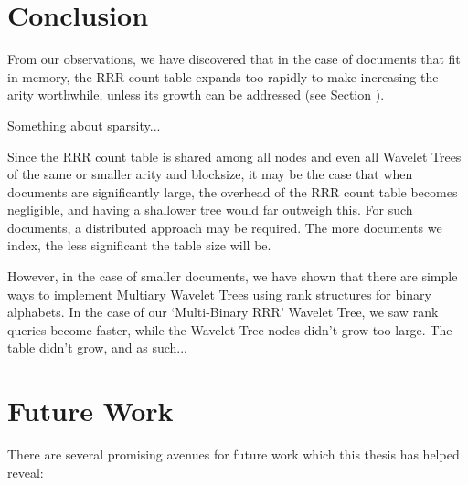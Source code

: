 \section{Conclusion}
\label{sec:conclusion}

From our observations, we have discovered that in the case of documents that fit 
in memory, the RRR count table expands too rapidly to make increasing the arity 
worthwhile, unless its growth can be addressed (see Section \label{sec:future}).

Something about sparsity...

Since the RRR count table is shared among all nodes and even all Wavelet Trees
of the same or smaller arity and blocksize, it may be the case that when 
documents are significantly large, the overhead of the RRR count table becomes 
negligible, and having a shallower tree would far outweigh this. For such 
documents, a distributed approach may be required. The more documents we index, 
the less significant the table size will be.

However, in the case of smaller documents, we have shown that there are simple 
ways to implement Multiary Wavelet Trees using rank structures for binary 
alphabets. In the case of our `Multi-Binary RRR' Wavelet Tree, we saw rank 
queries become faster, while the Wavelet Tree nodes didn't grow too large. The 
table didn't grow, and as such...

\section{Future Work}
\label{sec:future}
There are several promising avenues for future work which this thesis has helped
reveal:

